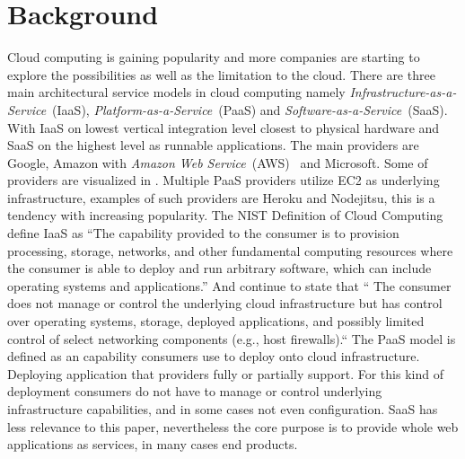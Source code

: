 \chapter{Background}




Cloud computing is gaining popularity and more companies are starting 
to explore the possibilities as well as the limitation to the cloud.
There are three main architectural service models in cloud computing\cite{introduction:wozniak10}
namely \emph{Infrastructure-as-a-Service}~(IaaS), \emph{Platform-as-a-Service}~(PaaS)
and \emph{Software-as-a-Service}~(SaaS).
With IaaS on lowest vertical integration level closest to physical hardware and SaaS on the highest
level as runnable applications.
The main providers are Google, Amazon with \emph{Amazon Web Service}~(AWS)~\cite{aws} and Microsoft.
Some of providers are visualized in .
Multiple PaaS providers utilize EC2 as underlying infrastructure, examples of such
providers are Heroku and Nodejitsu, this is a tendency with increasing popularity.
The NIST Definition of Cloud Computing~\cite{nist:mell11} define IaaS as
``The capability provided to the consumer is to provision 
processing, storage, networks, and other fundamental computing resources where the 
consumer is able to deploy and run arbitrary software, which can include operating 
systems and applications.'' 
And continue to state that `` The consumer does not manage or control the underlying cloud 
infrastructure but has control over operating systems, storage, deployed applications, and 
possibly limited control of select networking components (e.g., host firewalls).``
The PaaS model is defined as an capability consumers use to deploy onto cloud infrastructure.
Deploying application that providers fully or partially support. For this kind of deployment
consumers do not have to manage or control underlying infrastructure capabilities,
and in some cases not even configuration.
SaaS has less relevance to this paper, nevertheless the core purpose
is to provide whole web applications as services, in many cases end products.

